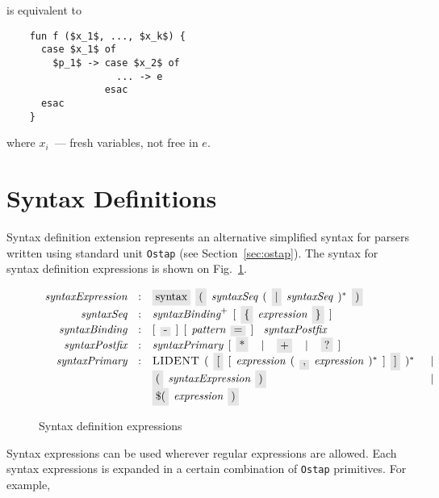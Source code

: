 is equivalent to

\begin{lstlisting}
    fun f ($x_1$, ..., $x_k$) {
      case $x_1$ of
        $p_1$ -> case $x_2$ of
                   ... -> e
                 esac
      esac
    }
\end{lstlisting}

where $x_i$~--- fresh variables, not free in $e$.

\section{Syntax Definitions}

Syntax definition extension represents an alternative simplified syntax for parsers written using standard unit \lstinline|Ostap| (see Section~\ref{sec:ostap}).
The syntax for syntax definition expressions is shown on Fig.~\ref{syntax_expressions}.

\begin{figure}[h]
  \[
    \begin{array}{rcll}
      \defterm{syntaxExpression}  & : & \term{syntax}\s\term{(}\s\nonterm{syntaxSeq}\s(\s\term{$\mid$}\s\nonterm{syntaxSeq}\s)^*\s\term{)}&\\
      \defterm{syntaxSeq}         & : & \nonterm{syntaxBinding}^+\s[\s\term{\{}\s\nonterm{expression}\s\term{\}}\s]&\\
      \defterm{syntaxBinding}     & : & [\s\term{-}\s]\s[\s\nonterm{pattern}\s\term{=}\s]\s\s\nonterm{syntaxPostfix}&\\
      \defterm{syntaxPostfix}     & : & \nonterm{syntaxPrimary}\s[\s\term{*}\s\alt\s\term{+}\s\alt\s\term{?}\s]&\\
      \defterm{syntaxPrimary}     & : & \token{LIDENT}\s(\s\term{[}\s[\s\nonterm{expression}\s(\s\term{,}\s\nonterm{expression}\s)^*\s]\s\term{]}\s)^*&\alt\\
                                  &   & \term{(}\s\nonterm{syntaxExpression}\s\term{)}&\alt\\
                                  &   & \term{\$(}\s\nonterm{expression}\s\term{)}&
    \end{array}
  \]
  \caption{Syntax definition expressions}
  \label{syntax_expressions}
\end{figure}

Syntax expressions can be used wherever regular expressions are allowed. Each syntax expressions is expanded in a certain combination of \lstinline|Ostap| primitives.
For example,

